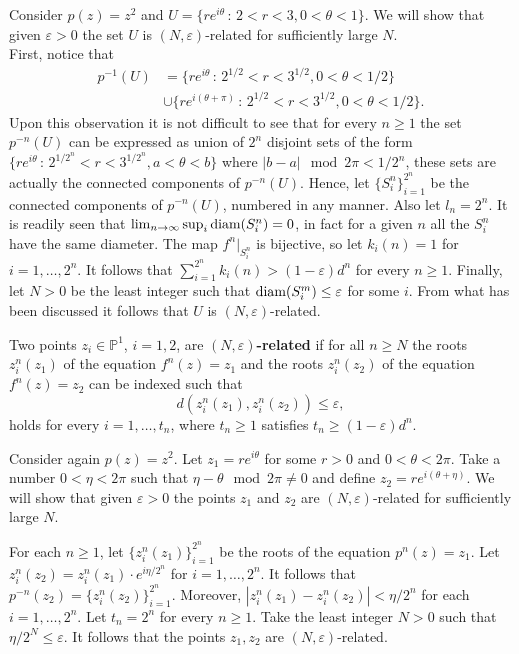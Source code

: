 \begin{myexmp}[breakable]{}{}
Consider $p(z)=z^2$ and $U=\{re^{i\theta}\,:\, 2<r<3, 0<\theta<1\}$. We will show that given $\varepsilon>0$ the set $U$ is $(N,\varepsilon)$-related for sufficiently large $N$.\\
First, notice that
\begin{align*}
p^{-1}(U) &= \{re^{i\theta}\,:\, 2^{1/2}<r<3^{1/2}, 0<\theta<1/2\}\\
&\cup \{re^{i(\theta+\pi)}\,:\, 2^{1/2}<r<3^{1/2}, 0<\theta<1/2\}.
\end{align*}
Upon this observation it is not difficult to see that for every $n\geq 1$ the set $p^{-n}(U)$ can be expressed as union of $2^n$ disjoint sets of the form $\{re^{i\theta}\,:\, 2^{1/2^n}<r<3^{1/2^n}, a<\theta<b\}$ where $|b-a| \mod 2\pi < 1/2^n$, these sets are actually the connected components of $p^{-n}(U)$. Hence, let $\{S_i^n\}_{i=1}^{2^n}$ be the connected components of $p^{-n}(U)$, numbered in any manner. Also let $l_n=2^n$. It is readily seen that $\lim_{n\rightarrow \infty} \sup_i \text{diam} (S_i^n)=0$, in fact for a given $n$ all the $S_i^n$ have the same diameter. The map $f^n|_{S_i^n}$ is bijective, so let $k_i(n)=1$ for $i=1,\dots,2^n$. It follows that $\sum_{i=1}^{2^n}k_i(n)>(1-\varepsilon)d^n$ for every $n\geq 1$. Finally, let $N>0$ be the least integer such that $\text{diam}(S_i^m) \leq \varepsilon$ for some $i$. From what has been discussed it follows that $U$ is $(N,\varepsilon)$-related.
\end{myexmp}

\begin{mydef}{}{}
Two points $z_i\in \mathbb{P}^1$, $i=1,2$, are {\bf $(N,\varepsilon)$-related} if for all $n\geq N$ the roots $z_i^n(z_1)$ of the equation $f^n(z) = z_1$ and the roots $z_i^n(z_2)$ of the equation $f^n(z) = z_2$ can be indexed such that
$$d(z_i^n(z_1),z_i^n(z_2)) \leq \varepsilon,$$
holds for every $i=1,\dots,t_n$, where $t_n\geq 1$ satisfies $t_n \geq (1-\varepsilon)d^n$.
\end{mydef}

\begin{myexmp}[breakable]{}{}
Consider again $p(z)=z^2$. Let $z_1=re^{i\theta}$ for some $r>0$ and $0<\theta<2\pi$. Take a number $0<\eta<2\pi$ such that $\eta-\theta \mod 2\pi \neq 0$ and define $z_2= re^{i(\theta+\eta)}$. We will show that given $\varepsilon>0$ the points $z_1$ and $z_2$ are $(N,\varepsilon)$-related for sufficiently large $N$.

For each $n\geq 1$, let $\{z_i^n(z_1)\}_{i=1}^{2^n}$ be the roots of the equation $p^n(z)=z_1$. Let $z_i^n(z_2) = z_i^n(z_1)\cdot e^{i\eta/2^n}$ for $i=1,\dots,2^n$. It follows that $p^{-n}(z_2) = \{z_i^n(z_2)\}_{i=1}^{2^n}$. Moreover, $|z_i^n(z_1)-z_i^n(z_2)|<\eta/2^n$ for each $i=1,\dots,2^n$. Let $t_n=2^n$ for every $n\geq 1$. Take the least integer $N>0$ such that $\eta/2^N\leq \varepsilon$. It follows that the points $z_1,z_2$ are $(N,\varepsilon)$-related.   
\end{myexmp}

